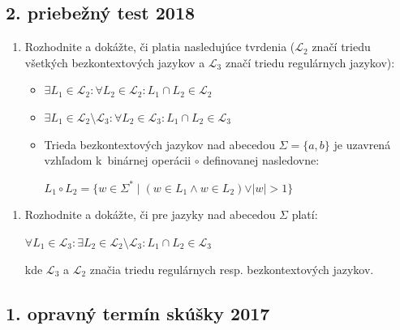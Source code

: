\documentclass[11pt,a4paper]{article}
\begin{document}
		\subsection{2. priebežný test 2018}

		\begin{enumerate}
			\item Rozhodnite a dokážte, či platia nasledujúce tvrdenia ($\mathcal{L}_2$ značí triedu všetkých bezkontextových jazykov a $\mathcal{L}_3$ značí triedu regulárnych jazykov):

			\begin{itemize}
				\item $\exists L_1 \in \mathcal{L}_2: \forall L_2 \in \mathcal{L}_2: L_1 \cap L_2 \in \mathcal{L}_2$
	
				\item $\exists L_1 \in \mathcal{L}_2 \setminus \mathcal{L}_3: \forall L_2 \in \mathcal{L}_3: L_1 \cap L_2 \in \mathcal{L}_3$
	
				\item Trieda bezkontextových jazykov nad abecedou $\Sigma = \{a,b\}$ je uzavrená vzhľadom k~binárnej operácii $\circ$ definovanej nasledovne:
	
				$L_1 \circ L_2 = \{w \in \Sigma^* \mid (w \in L_1 \land w \in L_2) \lor \vert w \vert > 1\}$
			\end{itemize}
		\end{enumerate}

		\begin{enumerate}
			\item Rozhodnite a dokážte, či pre jazyky nad abecedou $\Sigma$ platí:

			$\forall L_1 \in \mathcal{L}_3: \exists L_2 \in \mathcal{L}_2 \setminus \mathcal{L}_3: L_1 \cap L_2 \in \mathcal{L}_3$
	
			kde $\mathcal{L}_3$ a $\mathcal{L}_2$ značia triedu regulárnych resp. bezkontextových jazykov.
		\end{enumerate}

		\subsection{1. opravný termín skúšky 2017}
\end{document}
